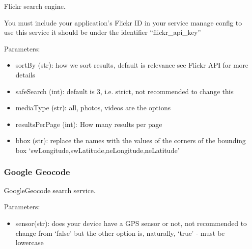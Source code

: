 \documentclass[letterpaper,10pt,english]{sphinxmanual}
\begin{document}
\begin{fulllineitems}
\label{api3.0:puppy.search.engine.Flickr}
Flickr search engine.

You must include your application's Flickr ID in your service manage config to use this service
it should be under the identifier ``flickr\_api\_key''

Parameters:
\begin{itemize}
\item {} 
sortBy (str):  how we sort results, default is relevance see Flickr API for more details

\item {} 
safeSearch (int): default is 3, i.e. strict, not recommended to change this

\item {} 
mediaType (str): all, photos, videos are the options

\item {} 
resultsPerPage (int): How many results per page

\item {} 
bbox (str): replace the names with the values of the corners of the bounding box `swLongitude,swLatitude,neLongitude,neLatitude'

\end{itemize}

\end{fulllineitems}



\subsubsection{Google Geocode}
\label{api3.0:google-geocode}

\begin{fulllineitems}
\label{api3.0:puppy.search.engine.GoogleGeocode}
GoogleGeocode search service.

Parameters:
\begin{itemize}
\item {} 
sensor(str): does your device have a GPS sensor or not, not recommended to change from `false' but the other option is, naturally, `true' - must be lowercase

\end{itemize}

\end{fulllineitems}
\end{document}
